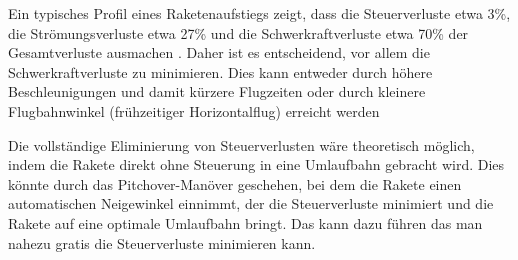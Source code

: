 Ein typisches Profil eines Raketenaufstiegs zeigt, dass die Steuerverluste etwa 3\%, die Strömungsverluste etwa 27\% und die Schwerkraftverluste etwa 70\% der Gesamtverluste ausmachen \cite{leo:astronautics}. 
Daher ist es entscheidend, vor allem die Schwerkraftverluste zu minimieren. 
Dies kann entweder durch höhere Beschleunigungen und damit kürzere Flugzeiten oder durch kleinere Flugbahnwinkel (frühzeitiger Horizontalflug) erreicht werden

Die vollständige Eliminierung von Steuerverlusten wäre theoretisch möglich, indem die Rakete direkt ohne Steuerung in eine Umlaufbahn gebracht wird. 
Dies könnte durch das Pitchover-Manöver geschehen, bei dem die Rakete einen automatischen Neigewinkel einnimmt, der die Steuerverluste minimiert und die Rakete auf eine optimale Umlaufbahn bringt. 
Das kann dazu führen das man nahezu gratis die Steuerverluste minimieren kann. 


